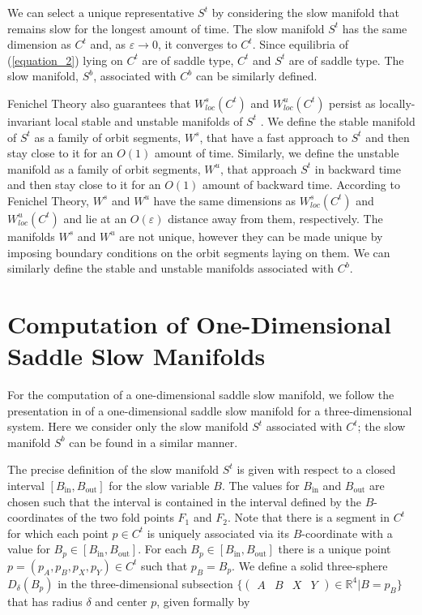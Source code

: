 \documentclass{ws-ijbc}
\begin{document}
We can select a unique representative $S^t$ by considering the slow manifold that remains slow for the longest amount of time.  The slow manifold $S^t$ has the same dimension as $C^t$ and, as $\varepsilon \rightarrow 0$, it converges to $C^t$.  Since equilibria of (\ref{equation_2}) lying on $C^t$ are of saddle type, $C^t$ and $S^t$ are of saddle type.  The slow manifold, $S^b$, associated with $C^b$ can be similarly defined.
    
Fenichel Theory also guarantees that $W^{s}_{loc}(C^t)$ and $W^{u}_{loc}(C^t)$ persist as locally-invariant local stable and unstable manifolds of $S^t$ \cite{Fenichel}.  We define the stable manifold of $S^t$ as a family of orbit segments, $W^s$, that have a fast approach to $S^t$ and then stay close to it for an $O(1)$ amount of time.  Similarly, we define the unstable manifold as a family of orbit segments, $W^u$, that approach $S^t$ in backward time and then stay close to it for an $O(1)$ amount of backward time.  According to Fenichel Theory, $W^s$ and $W^u$ have the same dimensions as $W^{s}_{loc}(C^t)$ and $W^{u}_{loc}(C^t)$ and lie at an $O(\varepsilon)$ distance away from them, respectively.  The manifolds $W^s$ and $W^u$ are not unique, however they can be made unique by imposing boundary conditions on the orbit segments laying on them.   We can similarly define the stable and unstable manifolds associated with $C^b$.
 
 \section{Computation of One-Dimensional Saddle Slow Manifolds}
    
For the computation of a one-dimensional saddle slow manifold, we follow the presentation in \cite{Saeed_Paper} of a one-dimensional saddle slow manifold for a three-dimensional system.  Here we consider only the slow manifold $S^t$ associated with $C^t$; the slow manifold $S^b$ can be found in a similar manner.
    
The precise definition of the slow manifold $S^t$ is given with respect to a closed interval $[B_{\mathrm{in}},B_{\mathrm{out}}]$ for the slow variable $B$.  The values for $B_{\mathrm{in}}$ and $B_{\mathrm{out}}$ are chosen such that the interval is contained in the interval defined by the $B$-coordinates of the two fold points $F_1$ and $F_2$.  Note that there is a segment in $C^t$ for which each point $p \in C^t$ is uniquely associated via its $B$-coordinate with a value for $B_p \in [B_{\mathrm{in}},B_{\mathrm{out}}]$.  For each $B_p \in [B_{\mathrm{in}},B_{\mathrm{out}}]$ there is a unique point $p=(p_A,p_B,p_X,p_Y) \in C^t$ such that $p_B = B_p$.  We define a solid three-sphere $D_\delta(B_p)$ in the three-dimensional subsection $\{ \begin{pmatrix} A & B & X & Y \end{pmatrix} \in \mathbb{R}^4| B=p_B\}$ that has radius $\delta$ and center $p$, given formally by
\end{document}

